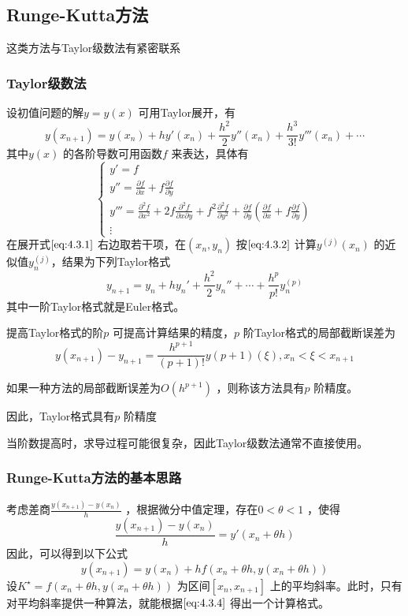 \documentclass[a4paper]{article}
\begin{document}
\subsection{Runge-Kutta方法}
这类方法与Taylor级数法有紧密联系
\subsubsection{Taylor级数法}
设初值问题的解$y = y(x)$ 可用Taylor展开，有
\[
y(x_{n+1}) = y(x_{n}) + h y'(x_{n}) + \frac{h^2}{2} y''(x_{n}) + \frac{h^3}{3!}y'''(x_{n}) + \cdots \tag{4.3.1} \label{eq:4.3.1} 
\] 
其中$y(x)$ 的各阶导数可用函数$f$ 来表达，具体有
\[
	\tag{4.3.2} \label{eq:4.3.2} 
	\begin{cases}
		y' = f \\
		y'' = \frac{\partial f}{\partial x} + f \frac{\partial f}{\partial y} \\
		y''' = \frac{\partial ^2 f}{\partial x^2} + 2f \frac{\partial ^2 f}{\partial x \partial y} + f^2 \frac{\partial ^2 f}{\partial y^2} + \frac{\partial f}{\partial y} (\frac{\partial f}{\partial x} + f \frac{\partial f}{\partial y} ) \\
		\vdots
	\end{cases} 
\] 
在展开式$\ref{eq:4.3.1}$ 右边取若干项，在$(x_{n},y_{n})$ 按$\ref{eq:4.3.2}$ 计算$y^{(j)}(x_{n})$ 的近似值$y_{n}^{(j)}$，结果为下列Taylor格式
\[
y_{n+1} = y_{n} + h y_{n}' + \frac{h^2}{2} y_{n}'' + \cdots + \frac{h^{p}}{p!} y_{n}^{(p)} \tag{4.3.3} \label{eq:4.3.3} 
\] 
其中一阶Taylor格式就是Euler格式。

提高Taylor格式的阶$p$ 可提高计算结果的精度，$p$ 阶Taylor格式的局部截断误差为
\[
y(x_{n+1}) - y_{n+1} = \frac{h^{p+1}}{(p+1)!} y{(p+1)}(\xi), x_{n} < \xi < x_{n+1}
\] 

\begin{definition}
	如果一种方法的局部截断误差为$O(h^{p+1})$ ，则称该方法具有$p$ 阶精度。
\end{definition}
因此，Taylor格式具有$p$ 阶精度

当阶数提高时，求导过程可能很复杂，因此Taylor级数法通常不直接使用。

\subsubsection{Runge-Kutta方法的基本思路}
考虑差商$\frac{y(x_{n+1}) - y(x_{n})}{h}$ ，根据微分中值定理，存在$0 < \theta < 1$ ，使得
\[
\frac{y(x_{n+1}) - y(x_{n})}{h} = y'(x_{n} + \theta h)
\] 
因此，可以得到以下公式
\[
y(x_{n+1}) = y(x_{n}) + h f(x_{n} + \theta h, y(x_{n} + \theta h)) \tag{4.3.4} \label{eq:4.3.4} 
\] 
设$K^{\star} = f(x_{n} + \theta h, y(x_{n} + \theta h))$ 为区间$[x_{n},x_{n+1}]$ 上的平均斜率。此时，只有对平均斜率提供一种算法，就能根据$\ref{eq:4.3.4}$ 得出一个计算格式。
\end{document}
